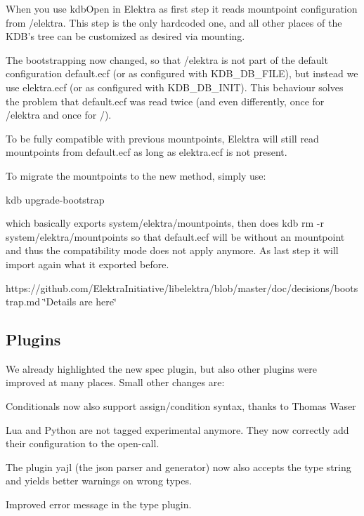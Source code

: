 When you use {\ttfamily kdb\+Open} in Elektra as first step it reads mountpoint configuration from {\ttfamily /elektra}. This step is the only hardcoded one, and all other places of the K\+D\+B's tree can be customized as desired via mounting.

The bootstrapping now changed, so that {\ttfamily /elektra} is not part of the default configuration {\ttfamily default.\+ecf} (or as configured with {\ttfamily K\+D\+B\+\_\+\+D\+B\+\_\+\+F\+I\+L\+E}), but instead we use {\ttfamily elektra.\+ecf} (or as configured with {\ttfamily K\+D\+B\+\_\+\+D\+B\+\_\+\+I\+N\+I\+T}). This behaviour solves the problem that {\ttfamily default.\+ecf} was read twice (and even differently, once for {\ttfamily /elektra} and once for {\ttfamily /}).

To be fully compatible with previous mountpoints, Elektra will still read mountpoints from {\ttfamily default.\+ecf} as long as {\ttfamily elektra.\+ecf} is not present.

To migrate the mountpoints to the new method, simply use\+: \begin{DoxyVerb}    kdb upgrade-bootstrap
\end{DoxyVerb}


which basically exports {\ttfamily system/elektra/mountpoints}, then does {\ttfamily kdb rm -\/r system/elektra/mountpoints} so that {\ttfamily default.\+ecf} will be without an mountpoint and thus the compatibility mode does not apply anymore. As last step it will import again what it exported before.

https\+://github.com/\+Elektra\+Initiative/libelektra/blob/master/doc/decisions/bootstrap.\+md \char`\"{}\+Details are here\char`\"{}

\subsection*{Plugins}

We already highlighted the new {\ttfamily spec} plugin, but also other plugins were improved at many places. Small other changes are\+:


\begin{DoxyItemize}
\item Conditionals now also support {\ttfamily assign/condition} syntax, thanks to Thomas Waser
\item Lua and Python are not tagged experimental anymore. They now correctly add their configuration to the open-\/call.
\item The plugin {\ttfamily yajl} (the json parser and generator) now also accepts the type {\ttfamily string} and yields better warnings on wrong types.
\item Improved error message in the {\ttfamily type} plugin.
\end{DoxyItemize}

